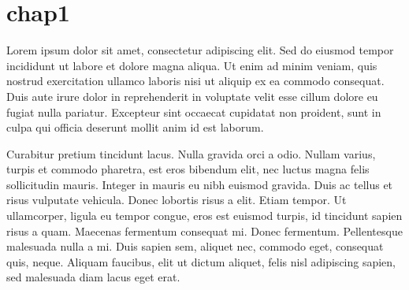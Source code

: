 \section{chap1}
Lorem ipsum dolor sit amet, consectetur adipiscing elit. Sed do eiusmod tempor incididunt ut labore et dolore magna aliqua. Ut enim ad minim veniam, quis nostrud exercitation ullamco laboris nisi ut aliquip ex ea commodo consequat. Duis aute irure dolor in reprehenderit in voluptate velit esse cillum dolore eu fugiat nulla pariatur. Excepteur sint occaecat cupidatat non proident, sunt in culpa qui officia deserunt mollit anim id est laborum.

Curabitur pretium tincidunt lacus. Nulla gravida orci a odio. Nullam varius, turpis et commodo pharetra, est eros bibendum elit, nec luctus magna felis sollicitudin mauris. Integer in mauris eu nibh euismod gravida. Duis ac tellus et risus vulputate vehicula. Donec lobortis risus a elit. Etiam tempor. Ut ullamcorper, ligula eu tempor congue, eros est euismod turpis, id tincidunt sapien risus a quam. Maecenas fermentum consequat mi. Donec fermentum. Pellentesque malesuada nulla a mi. Duis sapien sem, aliquet nec, commodo eget, consequat quis, neque. Aliquam faucibus, elit ut dictum aliquet, felis nisl adipiscing sapien, sed malesuada diam lacus eget erat.